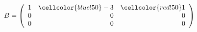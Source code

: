 \documentclass[border=1pt]{standalone}
\begin{document}
\thispagestyle{empty}
$
B=\left(\begin{array}{rrr}
1 & \cellcolor{blue!50}-3 & \cellcolor{red!50}1 \\
0 & 0 & 0 \\
0 & 0 & 0
\end{array}\right)
$
\end{document}
